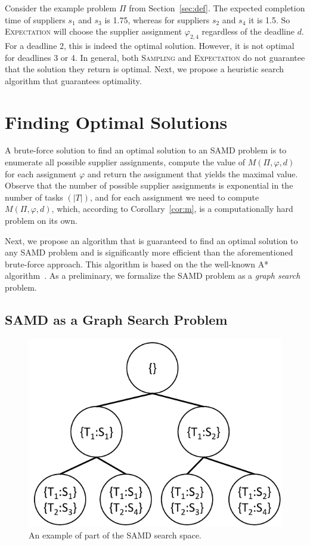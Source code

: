 \documentclass[letterpaper]{article}
\newcommand{\samd}{\ac{SAMD}\xspace}
\newcommand{\astar}{\textsc{A*}\xspace}
\newcommand{\sampling}{\textsc{Sampling}\xspace}
\newcommand{\expectation}{\textsc{Expectation}\xspace}
\begin{document}
Consider the example problem $\Pi$ from Section~\ref{sec:def}. The expected completion time of suppliers $s_1$ and $s_3$ is 1.75, whereas for suppliers $s_2$ and $s_4$ it is 1.5. So \expectation will choose the supplier assignment $\varphi_{2,4}$ regardless of the deadline $d$. For a deadline 2, this is indeed the optimal solution. However, it is not optimal for deadlines 3 or 4. In general, both \sampling and \expectation do not guarantee that the solution they return is optimal. Next, we propose a heuristic search algorithm that guarantees optimality.











\section{Finding Optimal Solutions}\label{sec:opt}




A brute-force solution to find an optimal solution to an \samd problem is to enumerate all possible supplier assignments,
compute the value of $M(\Pi,\varphi, d)$ for each assignment $\varphi$ and return the assignment that yields the maximal value. Observe that the number of possible supplier assignments is exponential in the number of tasks $(|T|)$, and for each assignment we need to compute $M(\Pi, \varphi, d)$, which, according to Corollary~\ref{cor:m}, is a computationally hard problem on its own.





Next, we propose an algorithm that is guaranteed to find an optimal solution to any \samd problem and is significantly more efficient than the aforementioned brute-force approach. This algorithm is based on the the well-known \astar algorithm~\cite{hart1968formal}. As a preliminary, we formalize the \samd problem as a \emph{graph search} problem.


\subsection{\samd as a Graph Search Problem}
\label{sec:graph}

\begin{figure}
    \centering
    \includegraphics[width=0.6\columnwidth]{search-space-samd_cropped.pdf}
    \caption{An example of part of the \samd search space.}
    \label{fig:search-space}
\end{figure}
\end{document}
